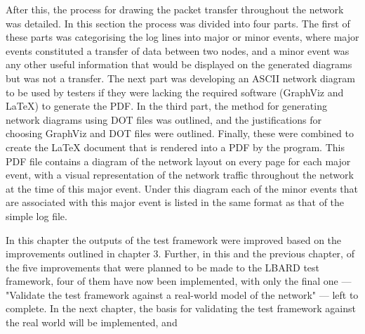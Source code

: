 After this, the process for drawing the packet transfer throughout the network was detailed.
In this section the process was divided into four parts.
The first of these parts was categorising the log lines into major or minor events, where major events constituted a transfer of data between two nodes, and a minor event was any other useful information that would be displayed on the generated diagrams but was not a transfer.
The next part was developing an ASCII network diagram to be used by testers if they were lacking the required software (GraphViz and LaTeX) to generate the PDF.
In the third part, the method for generating network diagrams using DOT files was outlined, and the justifications for choosing GraphViz and DOT files were outlined.
Finally, these were combined to create the LaTeX document that is rendered into a PDF by the program. 
This PDF file contains a diagram of the network layout on every page for each major event, with a visual representation of the network traffic throughout the network at the time of this major event.
Under this diagram each of the minor events that are associated with this major event is listed in the same format as that of the simple log file.


In this chapter the outputs of the test framework were improved based on the improvements outlined in chapter 3.
Further, in this and the previous chapter, of the five improvements that were planned to be made to the LBARD test framework, four of them have now been implemented, with only the final one — "Validate the test framework against a real-world model of the network" — left to complete.
In the next chapter, the basis for validating the test framework against the real world will be implemented, and 

